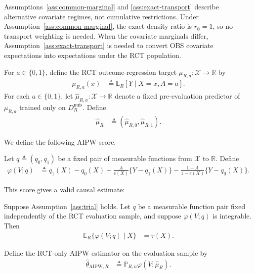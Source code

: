 Assumptions~\ref{ass:common-marginal} and \ref{ass:exact-transport} describe alternative covariate regimes, not cumulative restrictions. Under Assumption~\ref{ass:common-marginal}, the exact density ratio is $r_0=1$, so no transport weighting is needed. When the covariate marginals differ, Assumption~\ref{ass:exact-transport} is needed to convert OBS covariate expectations into expectations under the RCT population.

For $a\in\{0,1\}$, define the RCT outcome-regression target $\mu_{R,a}:\mathcal X\to\mathbb R$ by
\begin{align*}
	\mu_{R,a}(x) &\triangleq \mathbb E_R[Y\mid X=x,A=a].
\end{align*}
For each $a\in\{0,1\}$, let $\widehat\mu_{R,a}:\mathcal X\to\mathbb R$ denote a fixed pre-evaluation predictor of $\mu_{R,a}$ trained only on $D_R^{\mathrm{nuis}}$. Define
\begin{align}
	\widehat\mu_R &\triangleq (\widehat\mu_{R,0},\widehat\mu_{R,1}).
	\label{eq:rct-outcome-regression}
\end{align}

We define the following AIPW score.
\begin{definition}
\label{def:rct-aipw-score}
	Let $q\triangleq(q_0,q_1)$ be a fixed pair of measurable functions from
	$\mathcal X$ to $\mathbb R$. Define
	\begin{align}
		\varphi(V;q) &\triangleq q_1(X)-q_0(X) +\frac{A}{e(X)}\{Y-q_1(X)\} -\frac{1-A}{1-e(X)}\{Y-q_0(X)\}.
		\label{eq:aipw-score}
	\end{align}
\end{definition}

This score gives a valid causal estimate: 
\begin{proposition}
	\label{prop:pseudo-validity-active}
	\label{prop:pseudo-validity}
	Suppose Assumption~\ref{ass:trial} holds. Let $q$ be a measurable function pair fixed independently of the RCT evaluation sample, and suppose $\varphi(V;q)$ is integrable. Then
	\begin{align}
		\mathbb E_R\{\varphi(V;q)\mid X\} &=\tau(X).
		\label{eq:pseudo-valid}
	\end{align}
\end{proposition}

\begin{definition}
\label{def:rct-only-aipw}
	Define the RCT-only AIPW estimator on the evaluation sample by
	\begin{align}
		\widehat\theta_{\mathrm{AIPW},R}
		&\triangleq
		\mathbb P_{R,n}\varphi(V;\widehat\mu_R).
		\label{eq:rct-only-aipw}
	\end{align}
\end{definition}

